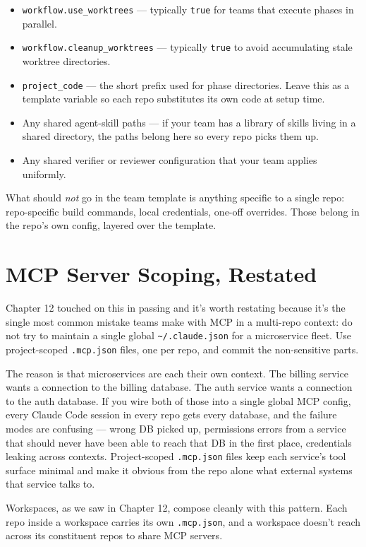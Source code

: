 \documentclass[11pt,letterpaper,openany]{book}
\begin{document}
\begin{itemize}
\item \texttt{workflow.use\_worktrees} --- typically \texttt{true}
  for teams that execute phases in parallel.
\item \texttt{workflow.cleanup\_worktrees} --- typically \texttt{true}
  to avoid accumulating stale worktree directories.
\item \texttt{project\_code} --- the short prefix used for phase
  directories. Leave this as a template variable so each repo
  substitutes its own code at setup time.
\item Any shared agent-skill paths --- if your team has a library
  of skills living in a shared directory, the paths belong here
  so every repo picks them up.
\item Any shared verifier or reviewer configuration that your team
  applies uniformly.
\end{itemize}

What should \emph{not} go in the team template is anything specific
to a single repo: repo-specific build commands, local credentials,
one-off overrides. Those belong in the repo's own config, layered
over the template.

\section{MCP Server Scoping, Restated}

Chapter 12 touched on this in passing and it's worth restating
because it's the single most common mistake teams make with MCP in
a multi-repo context: do not try to maintain a single global
\texttt{\~{}/.claude.json} for a microservice fleet. Use
project-scoped \texttt{.mcp.json} files, one per repo, and commit
the non-sensitive parts.

The reason is that microservices are each their own context. The
billing service wants a connection to the billing database. The
auth service wants a connection to the auth database. If you wire
both of those into a single global MCP config, every Claude Code
session in every repo gets every database, and the failure modes
are confusing --- wrong DB picked up, permissions errors from a
service that should never have been able to reach that DB in the
first place, credentials leaking across contexts. Project-scoped
\texttt{.mcp.json} files keep each service's tool surface minimal
and make it obvious from the repo alone what external systems
that service talks to.

Workspaces, as we saw in Chapter 12, compose cleanly with this
pattern. Each repo inside a workspace carries its own
\texttt{.mcp.json}, and a workspace doesn't reach across its
constituent repos to share MCP servers.
\end{document}
